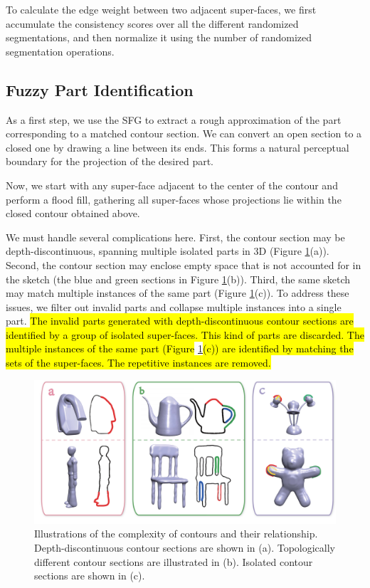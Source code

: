 To calculate the edge weight between two adjacent super-faces, we first accumulate the consistency scores over all the different randomized segmentations, and then normalize it using the number of randomized segmentation operations.

\subsection{Fuzzy Part Identification}
As a first step, we use the SFG to extract a rough approximation of the part corresponding to a matched contour section. We can convert an open section to a closed one by drawing a line between its ends. This forms a natural perceptual boundary for the projection of the desired part.

Now, we start with any super-face adjacent to the center of the contour and perform a flood fill, gathering all super-faces whose projections lie within the closed contour obtained above.

We must handle several complications here. First, the contour section may be depth-discontinuous, spanning multiple isolated parts in 3D (Figure \ref{fig:ComplexCtour}(a)). Second, the contour section may enclose empty space that is not accounted for in the sketch (the blue and green sections in Figure \ref{fig:ComplexCtour}(b)). Third, the same sketch may match multiple instances of the same part (Figure \ref{fig:ComplexCtour}(c)). To address these issues, we filter out invalid parts and collapse multiple instances into a single part. \hl{The invalid parts generated with depth-discontinuous contour sections are identified by a group of isolated super-faces. This kind of parts are discarded. The multiple instances of the same part (Figure }\ref{fig:ComplexCtour}\hl{(c)) are identified by matching the sets of the super-faces. The repetitive instances are removed.}

\begin{figure}\centering
\includegraphics[width=\linewidth]{./Material/ComplexCtour.pdf}
\caption{Illustrations of the complexity of contours and their relationship. Depth-discontinuous contour sections are shown in (a). Topologically different contour sections are illustrated in (b). Isolated contour sections are shown in (c).}\label{fig:ComplexCtour}
\end{figure}


